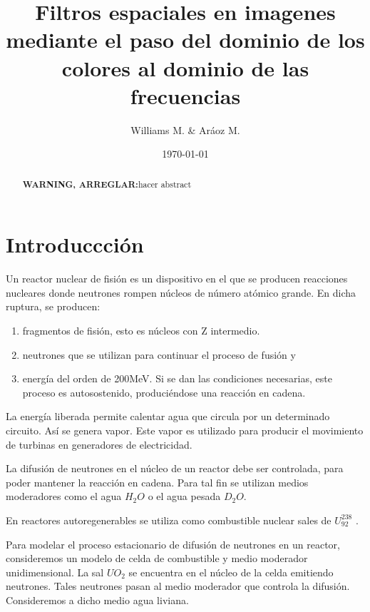 \documentclass[11pt,a4paper]{emulateapj}
\def \warn {{\sffamily\bfseries\large WARNING, ARREGLAR:}}
\begin{document}
\title{Filtros espaciales en imagenes mediante el paso del dominio de los colores al dominio de las frecuencias}
\author{Williams M. \& Aráoz M.}
\date{\today}


\begin{abstract}
\warn{hacer abstract}
\end{abstract}

\maketitle




\section{Introduccción}
\label{sec:introduccion}
Un reactor nuclear de fisión es un dispositivo en el que se producen reacciones nucleares
donde neutrones rompen núcleos de número atómico grande. En dicha ruptura, se
producen: 
\begin{enumerate}
	\item fragmentos de fisión, esto es núcleos con Z intermedio.
	\item neutrones que se utilizan para continuar el proceso de fusión y 
	\item energía del orden de 200MeV. Si se dan
las condiciones necesarias, este proceso es autosostenido, produciéndose una reacción en cadena.
\end{enumerate}
La energía liberada permite calentar agua que circula por un determinado circuito. Así
se genera vapor. Este vapor es utilizado para producir el movimiento de turbinas en
generadores de electricidad.

La difusión de neutrones en el núcleo de un reactor debe ser controlada, para poder mantener
la reacción en cadena. Para tal fin se utilizan medios moderadores como el agua $H_2O$
o el agua pesada $D_2O$.


En reactores autoregenerables se utiliza como combustible nuclear sales de $U^{238}_{92}$ .

Para modelar el proceso estacionario de difusión de neutrones en un reactor, consideremos
un modelo de celda de combustible y medio moderador unidimensional. La sal $UO_2$ se
encuentra en el núcleo de la celda emitiendo neutrones. Tales neutrones pasan al medio
moderador que controla la difusión. Consideremos a dicho medio agua liviana.
\end{document}
